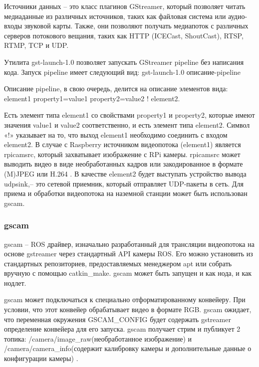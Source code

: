 Источники данных -- это класс плагинов GStreamer, который позволяет читать медиаданные из различных источников, таких как файловая система или аудио-входы звуковой карты. Также, они позволяют получать медиапоток с различных серверов потокового вещания, таких как HTTP (ICECast, ShoutCast), RTSP, RTMP, TCP и UDP. 

Утилита gst-launch-1.0 позволяет запускать GStreamer pipeline без написания кода. Запуск pipeline имеет следующий вид:
gst-launch-1.0 описание-pipeline

Описание pipeline, в свою очередь, делится на описание элементов вида:
element1 property1=value1 property2=value2 ! element2.

Есть элемент типа element1 со свойствами property1 и property2, которые имеют значения value1 и value2 соответственно, и есть элемент типа element2. Символ «!» указывает на то, что выход element1 необходимо соединить с входом element2.
В случае с Raspberry источником видеопотока (element1) является rpicamsrc, который захватывает изображение с RPi камеры. rpicamsrc может выводить видео в виде необработанных кадров или закодированное в формате (M)JPEG или H.264 \cite{gstreamer1}. В качестве element2 будет выступать устройство вывода udpsink,-- это сетевой приемник, который отправляет UDP-пакеты в сеть.
Для приема и обработки видеопотока на наземной станции может быть использован gscam.

\subsubsection{gscam}
gscam -- ROS драйвер, изначально разработанный для трансляции видеопотока на основе gstreamer через стандартный API камеры ROS. Его можно установить из стандартных репозиториев, предоставляемых менеджером apt или собрать вручную с помощью catkin\_make. gscam может быть запущен и как нода, и как нодлет.

gscam может подключаться к специально отформатированному конвейеру. При условии, что этот конвейер обрабатывает видео в формате RGB. gscam ожидает, что переменная окружения GSCAM\_CONFIG будет содержать gstreamer определение конвейера для его запуска.
gscam получает стрим и публикует 2 топика: /camera/image\_raw(необработанное изображение) и /camera/camera\_info(содержит калибровку камеры и дополнительные данные о конфигурации камеры) \cite{ros}.


